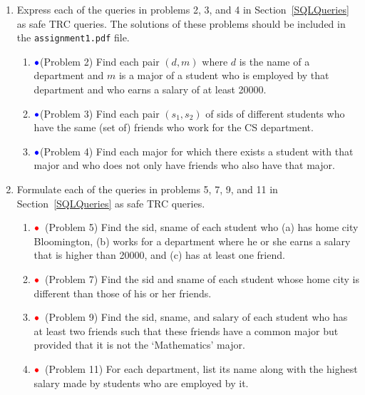 \documentclass{article}
\newcommand{\red}[1]{{\color{red}#1}}
\newcommand{\blue}[1]{{\color{blue}#1}}
\newcommand{\redbullet}{$\red{\bullet}$}
\newcommand{\bluebullet}{$\blue{\bullet}$}
\begin{document}
\begin{enumerate}[resume]
\item Express each of the queries in problems 2, 3, and 4
in Section~\ref{SQLQueries} as safe TRC queries.
The solutions of these problems should be included in the {\tt assignment1.pdf} file.

\begin{enumerate}
\item \bluebullet (Problem 2) Find each pair $(d, m)$ where $d$ is the name of a department and $m$ is a major of 
a student who is employed by that department and who earns a salary of at least 20000.


\item \bluebullet (Problem 3) Find each pair $(s_1,s_2)$ of sids of different students who have the same (set of) friends who work for the CS department.



\item \bluebullet (Problem 4) Find each major for which there exists a student with that major and who does not only have friends who also have that major.



\end{enumerate}

\item Formulate each of the queries in problems 5, 7, 9, and 11 in Section~\ref{SQLQueries} as safe TRC queries.

\begin{enumerate}[resume]
\item \redbullet\ (Problem 5) Find the sid, sname of each student who (a) has home city Bloomington, 
(b) works for a department where he or she earns a salary that is higher than 20000, and (c) has at least one friend.

\item \redbullet\ (Problem 7) Find the sid and sname of each student whose home city is different than those of his or her friends.

\item \redbullet\ (Problem 9) Find the sid, sname, and salary of each student who has at least two friends such that these friends have a common major but provided that it is not the `Mathematics' major.



\item \redbullet\ (Problem 11) For each department, list its name along with the highest salary made by students who are employed by it.


\end{enumerate}
\end{enumerate}
\newpage
\end{document}
